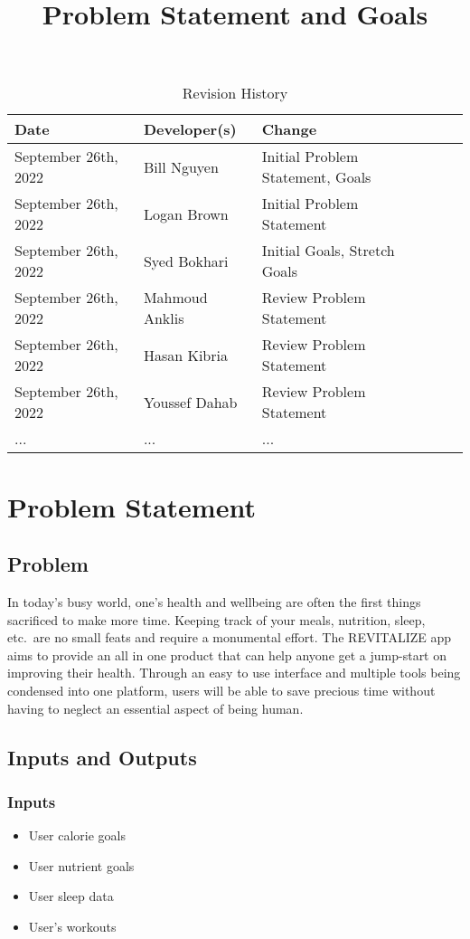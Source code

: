 \documentclass[12pt,letterpaper]{article}
\title{Problem Statement and Goals\\\progname}
\author{\authname}
\date{}
\begin{document}
\maketitle

\begin{table}[hp]
\caption{Revision History} \label{TblRevisionHistory}
\begin{tabularx}{\textwidth}{XlXlX}
\toprule
\textbf{Date} & \textbf{Developer(s)} & \textbf{Change}\\
\midrule
		September 26th, 2022 & Bill Nguyen  & Initial Problem Statement, Goals \\
		September 26th, 2022 & Logan Brown & Initial Problem Statement\\
		September 26th, 2022 & Syed Bokhari & Initial Goals, Stretch Goals\\
		September 26th, 2022 & Mahmoud Anklis  & Review Problem Statement\\
		September 26th, 2022 & Hasan Kibria  & Review Problem Statement\\
		September 26th, 2022 & Youssef Dahab& Review Problem Statement\\
... & ... & ...\\
\bottomrule
\end{tabularx}
\end{table}

\section{Problem Statement}

\subsection{Problem}
\noindent
In today's busy world, one's health and wellbeing are often the first things sacrificed to make more time. Keeping track of your meals, nutrition, sleep, etc.\ are no small feats and require a monumental effort. The REVITALIZE app aims to provide an all in one product that can help anyone get a jump-start on improving their health. Through an easy to use interface and multiple tools being condensed into one platform, users will be able to save precious time without having to neglect an essential aspect of being human.

\subsection{Inputs and Outputs}
\subsubsection{Inputs}
\begin{itemize}
    \item User calorie goals
    \item User nutrient goals
    \item User sleep data
    \item User's workouts 
\end{itemize}
\end{document}
